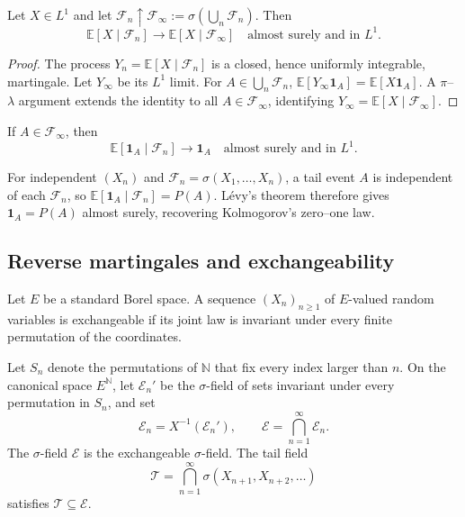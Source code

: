 \begin{thm}
Let $X\in L^1$ and let
$\mathcal F_n\uparrow\mathcal F_\infty:=
\sigma(\bigcup_n\mathcal F_n)$. Then
\[
\mathbb E[X\mid\mathcal F_n]
 \longrightarrow\mathbb E[X\mid\mathcal F_\infty]
\quad\text{almost surely and in }L^1.
\]
\end{thm}

\begin{proof}
The process $Y_n=\mathbb E[X\mid\mathcal F_n]$ is a closed, hence uniformly
integrable, martingale. Let $Y_\infty$ be its $L^1$ limit. For
$A\in\bigcup_n\mathcal F_n$,
$\mathbb E[Y_\infty\mathbf1_A]=\mathbb E[X\mathbf1_A]$. A
$\pi$--$\lambda$ argument extends the identity to all
$A\in\mathcal F_\infty$, identifying
$Y_\infty=\mathbb E[X\mid\mathcal F_\infty]$.
\end{proof}

\begin{cor}
If $A\in\mathcal F_\infty$, then
\[
\mathbb E[\mathbf1_A\mid\mathcal F_n]\to\mathbf1_A
\quad\text{almost surely and in }L^1.
\]
\end{cor}

\begin{remark}
For independent $(X_n)$ and
$\mathcal F_n=\sigma(X_1,\ldots,X_n)$, a tail event $A$ is independent of
each $\mathcal F_n$, so
$\mathbb E[\mathbf1_A\mid\mathcal F_n]=P(A)$. L\'evy's theorem therefore
gives $\mathbf1_A=P(A)$ almost surely, recovering Kolmogorov's zero--one law.
\end{remark}

\subsection{Reverse martingales and exchangeability}

\begin{de}[Exchangeability]
Let $E$ be a standard Borel space. A sequence $(X_n)_{n\geq1}$ of $E$-valued
random variables is exchangeable if its joint law is invariant under every
finite permutation of the coordinates.
\end{de}

Let $S_n$ denote the permutations of $\mathbb N$ that fix every index larger
than $n$. On the canonical space $E^{\mathbb N}$, let $\mathcal E_n'$ be the
$\sigma$-field of sets invariant under every permutation in $S_n$, and set
\[
\mathcal E_n=X^{-1}(\mathcal E_n'),
\qquad
\mathcal E=\bigcap_{n=1}^{\infty}\mathcal E_n.
\]
The $\sigma$-field $\mathcal E$ is the exchangeable $\sigma$-field. The tail field
\[
\mathcal T=\bigcap_{n=1}^{\infty}
 \sigma(X_{n+1},X_{n+2},\ldots)
\]
satisfies $\mathcal T\subseteq\mathcal E$.

